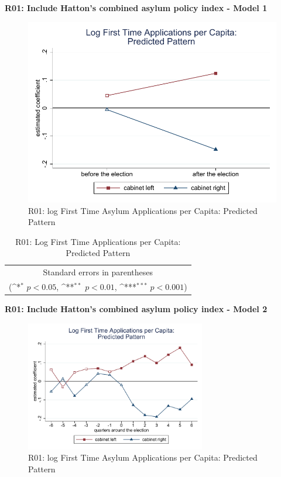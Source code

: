 \documentclass[10pt,a4paper]{scrartcl}
\begin{document}
\clearpage
\textbf{R01: Include Hatton's combined asylum policy index - Model 1}
\begin{figure}[!ht]
	\centering
	\includegraphics[width=1\textwidth]{figures_edited/app_graph1_R01.pdf}
	\caption{R01: log First Time Asylum Applications per Capita: Predicted Pattern}
\end{figure}

\begin{table}[!ht]\centering
	\renewcommand{\arraystretch}{1.25}
	\def\sym#1{\ifmmode^{#1}\else\(^{#1}\)\fi}
	\caption{R01: Log First Time Applications per Capita: Predicted Pattern}
	\begin{tabular}{l*{2}{c}}
		\hline\hline
		
		\hline\hline
		\multicolumn{3}{c}{\footnotesize Standard errors in parentheses} \\
		\multicolumn{3}{c}{\footnotesize (\sym{*} \(p<0.05\), \sym{**} \(p<0.01\), \sym{***} \(p<0.001\))}\\
	\end{tabular}
\end{table}

\clearpage
\textbf{R01: Include Hatton's combined asylum policy index - Model 2}
\begin{figure}[!ht]
	\centering
	\includegraphics[width=0.7\textwidth]{figures_edited/app_graph2_R01.pdf}
	\caption{R01: log First Time Asylum Applications per Capita: Predicted Pattern}
\end{figure}
\end{document}
